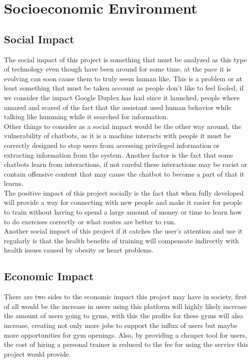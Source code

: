 \chapter{Socioeconomic Environment}\label{chap:8}
\section{Social Impact}\label{sec:chap6_soc}

The social impact of this project is something that must be analyzed as this type of technology even though have been around for some time, at the pace it is evolving can soon cause them to truly seem human like. This is a problem or at least something that must be taken account as people don’t like to feel fooled, if we consider the impact Google Duplex has had since it launched, people where amazed and scared of the fact that the assistant used human behavior while talking like humming while it searched for information.\\

Other things to consider as a social impact would be the other way around, the vulnerability of chatbots, as it is a machine interacts with people it must be correctly designed to stop users from accessing privileged information or extracting information from the system. Another factor is the fact that some chatbots learn from interactions, if not careful these interactions may be racist or contain offensive content that may cause the chatbot to become a part of that it learns.\\

The positive impact of this project socially is the fact that when fully developed will provide a way for connecting with new people and make it easier for people to train without having to spend a large amount of money or time to learn how to do exercises correctly or what routes are better to run.\\

Another social impact of this project if it catches the user’s attention and use it regularly is that the health benefits of training will compensate indirectly with health issues caused by obesity or heart problems.


\section{Economic Impact}\label{sec:chap6_eco}

There are two sides to the economic impact this project may have in society, first of all would be the increase in users using this platform will highly likely increase the amount of users going to gyms, with this the profits for these gyms will also increase, creating not only more jobs to support the influx of users but maybe more opportunities for gym openings. Also, by providing a cheaper tool for users, the cost of hiring a personal trainer is reduced to the fee for using the service this project would provide.\\

